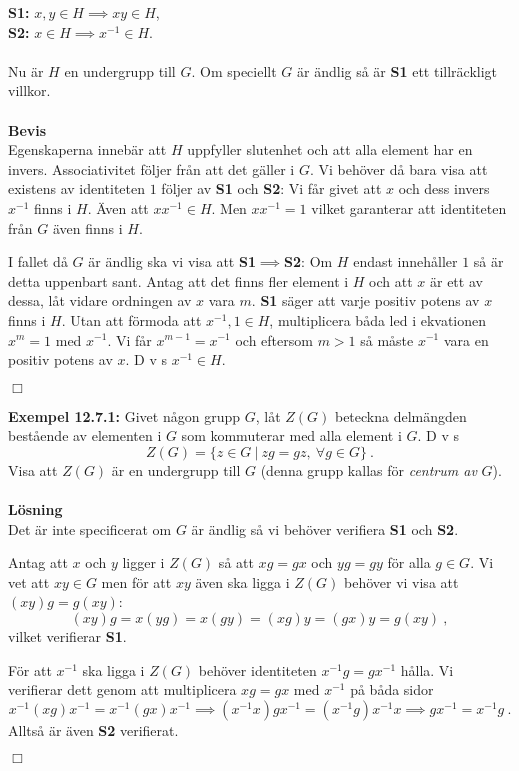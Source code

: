 \documentclass{article}
\begin{document}
\textbf{S1:} $x,y\in H \implies xy\in H$,\\

\textbf{S2:} $x\in H\implies x^{-1}\in H$.\\ \\
Nu är $H$ en undergrupp till $G$. Om speciellt $G$ är ändlig så är \textbf{S1} ett tillräckligt villkor.\\ \\
\textbf{Bevis}\\
Egenskaperna innebär att $H$ uppfyller slutenhet och att alla element har en invers. Associativitet följer från att det gäller i $G$. Vi behöver då bara visa att existens av identiteten $1$ följer av \textbf{S1} och \textbf{S2}: Vi får givet att $x$ och dess invers $x^{-1}$ finns i $H$. Även att $xx^{-1}\in H$. Men $xx^{-1}=1$ vilket garanterar att identiteten från $G$ även finns i $H$.

I fallet då $G$ är ändlig ska vi visa att \textbf{S1}$\implies$\textbf{S2}: Om $H$ endast innehåller $1$ så är detta uppenbart sant. Antag att det finns fler element i $H$ och att $x$ är ett av dessa, låt vidare ordningen av $x$ vara $m$. \textbf{S1} säger att varje positiv potens av $x$ finns i $H$. Utan att förmoda att $x^{-1},1\in H$, multiplicera båda led i ekvationen $x^m=1$ med $x^{-1}$. Vi får $x^{m-1}=x^{-1}$ och eftersom $m>1$ så måste $x^{-1}$ vara en positiv potens av $x$. D v s $x^{-1}\in H$.
\begin{flushright}
$\Box$
\end{flushright}
\textbf{Exempel 12.7.1:} Givet någon grupp $G$, låt $Z(G)$ beteckna delmängden bestående av elementen i $G$ som kommuterar med alla element i $G$. D v s
$$
Z(G)=\{z\in G \ | \ zg=gz, \ \forall g\in G\} \ .
$$
Visa att $Z(G)$ är en undergrupp till $G$ (denna grupp kallas för \textit{centrum av} $G$).\\ \\ 
\textbf{Lösning}\\ 
Det är inte specificerat om $G$ är ändlig så vi behöver verifiera \textbf{S1} och \textbf{S2}. 

Antag att $x$ och $y$ ligger i $Z(G)$ så att $xg=gx$ och $yg=gy$ för alla $g\in G$. Vi vet att $xy\in G$ men för att $xy$ även ska ligga i $Z(G)$ behöver vi visa att $(xy)g=g(xy)$: 
$$
(xy)g=x(yg)=x(gy)=(xg)y=(gx)y=g(xy) \ ,
$$
vilket verifierar \textbf{S1}. 

För att $x^{-1}$ ska ligga i $Z(G)$ behöver identiteten $x^{-1}g=gx^{-1}$ hålla. Vi verifierar dett genom att multiplicera $xg=gx$ med $x^{-1}$ på båda sidor
$$
x^{-1}(xg)x^{-1}=x^{-1}(gx)x^{-1}\implies (x^{-1}x)gx^{-1}=(x^{-1}g)x^{-1}x\implies gx^{-1}=x^{-1}g \ .
$$
Alltså är även \textbf{S2} verifierat.
\begin{flushright}
$\Box$
\end{flushright}
\end{document}
